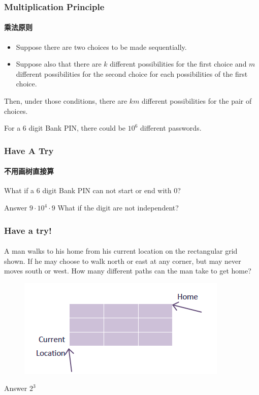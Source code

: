 \documentclass[
	11pt, %
]{beamer}
\begin{document}

\begin{frame}
	\frametitle{Multiplication Principle} %
	\framesubtitle{乘法原则}
	\begin{definition}
		\begin{itemize}
			\item Suppose there are two choices to be made sequentially.
			\item Suppose also that there are $k$ different possibilities for the first choice and $m$ different possibilities for the second choice for each possibilities of the first choice. 
		\end{itemize}
				Then, \alert{under those conditions}, there are $km$ different possibilities for the pair of choices.
	\end{definition}
	\begin{example}
	For a 6 digit Bank PIN, there could be $10^6$ different passwords. 
	\end{example}
\end{frame}


\begin{frame}
	\frametitle{Have A Try} %
	\framesubtitle{ 不用画树直接算}
	What if a 6 digit Bank PIN can not start or end with 0?

	\bigskip \bigskip
	Answer \textbf{$9 \cdot 10^4 \cdot 9$}
	\alert{What if the digit are not independent?}
\end{frame}



\begin{frame}
	\frametitle{Have a try!}
	\framesubtitle{}
A man walks to his home from his current location on the rectangular grid shown. If
he may choose to walk north or east at any corner, but may never moves south or
west. How many different paths can the man take to get home?
	\begin{figure}
		\includegraphics[width=0.5\linewidth]{Man_Walk.png}
	\end{figure}
\bigskip
\pause
Answer \textbf{$2^3$}
\bigskip

\end{frame}
\end{document}
